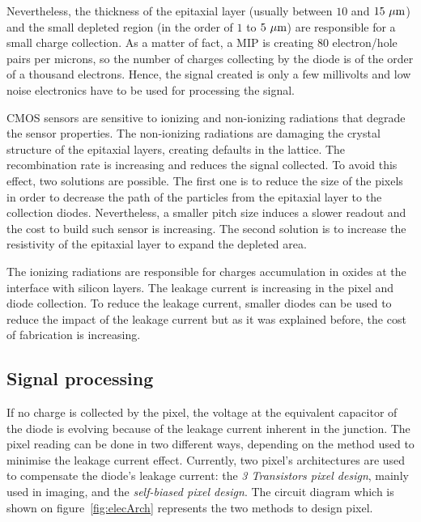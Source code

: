     Nevertheless, the thickness of the epitaxial layer (usually between $10$ and $15~\rm{\mu m}$) and the small depleted region (in the order of $1$ to $5~\rm{\mu m}$) are responsible for a small charge collection.
    As a matter of fact, a \gls{MIP} is creating 80 electron/hole pairs per microns, so the number of charges collecting by the diode is of the order of a thousand electrons.
    Hence, the signal created is only a few millivolts and low noise electronics have to be used for processing the signal.

    CMOS sensors are sensitive to ionizing and non-ionizing radiations that degrade the sensor properties.
    The non-ionizing radiations are damaging the crystal structure of the epitaxial layers, creating defaults in the lattice.
    The recombination rate is increasing and reduces the signal collected.
    To avoid this effect, two solutions are possible.
    The first one is to reduce the size of the pixels in order to decrease the path of the particles from the epitaxial layer to the collection diodes.
    Nevertheless, a smaller pitch size induces a slower readout and the cost to build such sensor is increasing.
    The second solution is to increase the resistivity of the epitaxial layer to expand the depleted area.
    
    The ionizing radiations are responsible for charges accumulation in oxides at the interface with silicon layers.
    The leakage current is increasing in the pixel and diode collection.
    To reduce the leakage current, smaller diodes can be used to reduce the impact of the leakage current but as it was explained before, the cost of fabrication is increasing.
    
    \subsection{Signal processing}

    If no charge is collected by the pixel, the voltage at the equivalent capacitor of the diode is evolving because of the leakage current inherent in the junction.
    The pixel reading can be done in two different ways, depending on the method used to minimise the leakage current effect.
    Currently, two pixel's architectures are used to compensate the diode's leakage current: the \textit{3 Transistors pixel design}, mainly used in imaging, and the \textit{self-biased pixel design}.
    The circuit diagram which is shown on figure~\ref{fig:elecArch} represents the two methods to design pixel.


